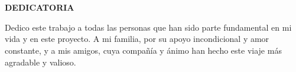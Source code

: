 \chapter*{} %
\vspace*{-2cm} %
\begin{center}
    \textbf{\Large DEDICATORIA} %
\end{center}
\justifying
Dedico este trabajo a todas las personas que han sido parte fundamental en mi vida y en este proyecto. A mi familia, por su apoyo incondicional y amor constante, y a mis amigos, cuya compañía y ánimo han hecho este viaje más agradable y valioso.
